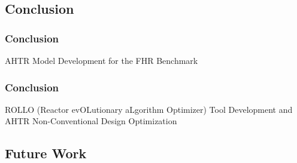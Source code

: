\subsection{Conclusion}
\begin{frame}
    \frametitle{Conclusion}
    AHTR Model Development for the FHR Benchmark
\end{frame}

\begin{frame}
    \frametitle{Conclusion}
    ROLLO (Reactor evOLutionary aLgorithm Optimizer) Tool Development and AHTR 
    Non-Conventional Design Optimization
\end{frame}

\subsection{Future Work}